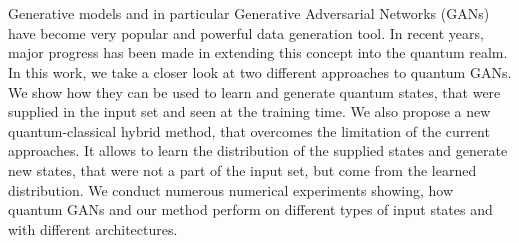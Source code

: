 \chapter{\abstractname}

Generative models and in particular Generative Adversarial Networks (GANs) have become very popular and powerful data generation tool. In recent years, major progress has been made in extending this concept into the quantum realm. In this work, we take a closer look at two different approaches to quantum GANs. We show how they can be used to learn and generate quantum states, that were supplied in the input set and seen at the training time. We also propose a new quantum-classical hybrid method, that overcomes the limitation of the current approaches. It allows to learn the distribution of the supplied states and generate new states, that were not a part of the input set, but come from the learned distribution. We conduct numerous numerical experiments showing, how quantum GANs and our method perform on different types of input states and with different architectures.






%
%
%
%
%
